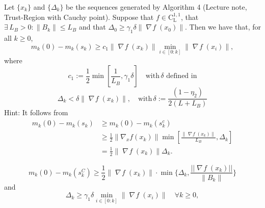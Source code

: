 \documentclass{ExerciseSheet}
\newif\ifsolutions
\newcommand{\LC}{\mathord{\mathrm{C^{1,1}_{L}}}}
\DeclareMathOperator*{\grad}{\mathit{\nabla \!f}}
\newcommand{\with}{\mathord{\mathrm{with }}\,}
\begin{document}
\begin{problem}\label{lemma:model_decrease2}
	Let $\{x_k\}$ and $\{\Delta_k\}$ be the sequences generated by  Algorithm 4 (Lecture note, Trust-Region with Cauchy point). Suppose that $f\in \LC$, that $\exists\, L_B>0: \|B_k\| \leq L_B$ and that $\Delta_0\geq \gamma_1 \delta \|\grad(x_0)\|$. Then we have that, for all $k \geq 0$,
	\begin{equation*}
		m_k(0) - m_k(s_k) \geq c_1 \|\grad(x_k)\| \min_{i \in [0:k]} \|\grad(x_i)\|,
	\end{equation*}
	where
	\begin{equation*}
		c_1 := \frac{1}{2} \min \left[ \frac{1}{L_B}, \gamma_1\delta \right] \quad \with \delta \text{ defined in} 
	\end{equation*}
    \begin{equation}\label{eq:successful_condition}
		\Delta_k < \delta\|\grad(x_k)\|, \quad \with \delta:=\frac{(1 - \eta_2)}{2(L + L_B)}
	\end{equation}
Hint: It follows from \begin{align}
		m_k(0) - m_k(s_k) &\geq m_k(0) - m_k(s_k^c) \\
		&\geq \frac{1}{2} \|\nabla_x f(x_k)\| \min \left[ \frac{\|\grad(x_k)\|}{L_B}, \Delta_k \right] \\
		&= \frac{1}{2} \|\grad(x_k)\| \Delta_k.
	\end{align}
    
    \begin{equation}\label{eq:model_decrease}
		m_k(0)-m_k(s_k^C) \geq \frac{1}{2}\|\grad(x_k)\|\cdot \min\{\Delta_k, \frac{||\grad(x_k)||}{\|B_k\|} \}
	\end{equation} and \begin{equation}\label{eq:deltamin}
		\Delta_k \geq \gamma_1 \delta \min_{i \in [0:k]} \|\grad(x_i)\| \quad \forall k\geq 0,
	\end{equation}

\end{problem}
\ifsolutions
\vskip 0.3cm
\end{document}
